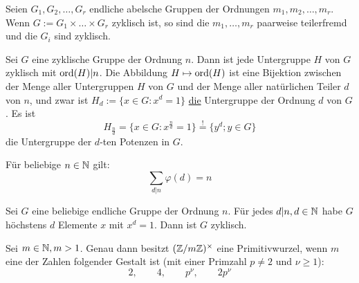 \begin{falko} \label{satz_4.5}
	Seien $G_1,G_2,\dots,G_r$ endliche abelsche Gruppen der Ordnungen $m_1,m_2,\dots,m_r$. Wenn $G:= G_1 \times \dots \times G_r$ zyklisch ist, so sind die $m_1,\dots,m_r$ paarweise teilerfremd und die $G_i$ sind zyklisch.
\end{falko}

\begin{falko} \label{satz_4.6}
	Sei $G$ eine zyklische Gruppe der Ordnung $n$. Dann ist jede Untergruppe $H$ von $G$ zyklisch mit $\operatorname{ord}(H) | n$. Die Abbildung $H \mapsto \operatorname{ord}(H)$ ist eine Bijektion zwischen der Menge aller Untergruppen $H$ von $G$ und der Menge aller natürlichen Teiler $d$ von $n$, und zwar ist $H_d := \{x \in G : x^d = 1\}$ \underline{die} Untergruppe der Ordnung $d$ von $G$. Es ist
	\[ H_{\frac{n}{d}} = \{x \in G : x^{\frac{n}{d}}=1 \} \overset{!}{=} \{y^d ; y \in G\} \]
	die Untergruppe der $d$-ten Potenzen in $G$.
\end{falko}

	Für beliebige $n \in \mathbb{N}$ gilt:
	\[ \sum_{d | n} \varphi(d) = n \]
	
	Sei $G$ eine beliebige endliche Gruppe der Ordnung $n$. Für jedes $d | n, d \in \mathbb{N}$ habe $G$ höchstens $d$ Elemente $x$ mit $x^d = 1$. Dann ist $G$ zyklisch.
	
\begin{satz} \label{satz_4.4}
	Sei $m \in \mathbb{N}, m > 1$. Genau dann besitzt $(\mathbb{Z}/m\mathbb{Z})^\times$ eine Primitivwurzel, wenn $m$ eine der Zahlen folgender Gestalt ist (mit einer Primzahl $p \neq 2$ und $\nu \geq 1$):
	\[ 2, \qquad 4, \qquad p^\nu, \qquad 2p^\nu \]
\end{satz}